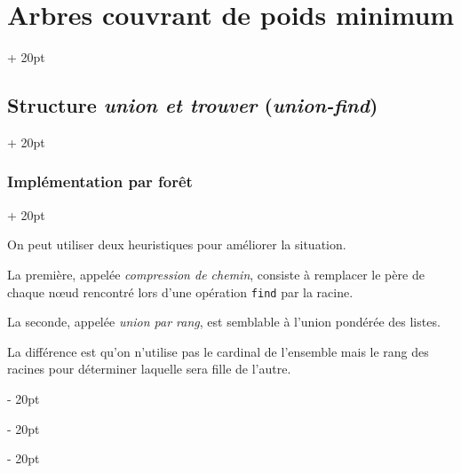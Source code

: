 \documentclass[a4paper, 12pt, twoside]{article}
\newcommand{\ind}[1][20pt]{\advance\leftskip + #1}
\newcommand{\deind}[1][20pt]{\advance\leftskip - #1}
\newenvironment{indt}[2][20pt]{#2 \par \ind[#1]}{\par \deind} %
\begin{document}
\begin{indt}{\section{Arbres couvrant de poids minimum}}
\begin{indt}{\subsection{Structure \textit{union et trouver} (\textit{union-find})}}
\begin{indt}{\subsubsection{Implémentation par forêt}}
                \vspace{12pt}
                
                On peut utiliser deux heuristiques pour améliorer la situation.

                La première, appelée \textit{compression de chemin}, consiste à remplacer le père de chaque n\oe ud rencontré lors d'une opération \texttt{find} par la racine.

                \begin{center}
                \end{center}

                \begin{center}
                \end{center}

                La seconde, appelée \textit{union par rang}, est semblable à l'union pondérée des listes.

                La différence est qu'on n'utilise pas le cardinal de l'ensemble mais le rang des racines pour déterminer laquelle sera fille de l'autre.


\end{indt}
\end{indt}
\end{indt}
\end{document}
